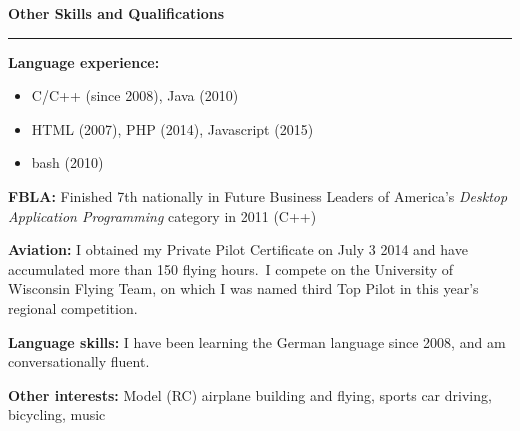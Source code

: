 \documentclass[12pt,letterpaper]{article}
\newenvironment{details}{
    \vspace{-.5em}
    \begin{itemize}
        \renewcommand \labelitemi{\labelitemiv}
        \setlength{\itemsep}{0pt}
        \setlength{\parskip}{-1pt}
        \setlength{\parsep}{0pt}
    }{
    \end{itemize}
    \vspace{-.5em}
}
\newcommand{\hr} {
    \vspace{-1em}
    \par\rule{\textwidth}{1pt}
    \vspace{-1.5em}
}
\newcommand{\ressection}[1] {
    \par{\large \textbf{#1}}
    \hr
}
\newenvironment{other} {
    \ressection{Other Skills and Qualifications}
    \setlength{\parskip}{3pt}
}{
    \vspace{0.5em}
}
\begin{document}
\begin{other}
\par \textbf{Language experience:}
\vspace{-.5em}
\begin{details}
    \item C/C++ (since 2008), Java (2010)
    \item HTML (2007), PHP (2014), Javascript (2015)
    \item bash (2010)
\end{details}
\par \textbf{FBLA:} Finished 7th nationally in Future Business Leaders of America's \textit{Desktop Application Programming} category in 2011 (C++)

\par \textbf{Aviation:} I obtained my Private Pilot Certificate on July 3 2014 and have accumulated more than 150 flying hours.~I compete on the University of Wisconsin Flying Team, on which I was named third Top Pilot in this year's regional competition.

\par \textbf{Language skills:} I have been learning the German language since 2008, and am conversationally fluent.

\par \textbf{Other interests:} Model (RC) airplane building and flying, sports car driving, bicycling, music

\end{other}
\end{document}
